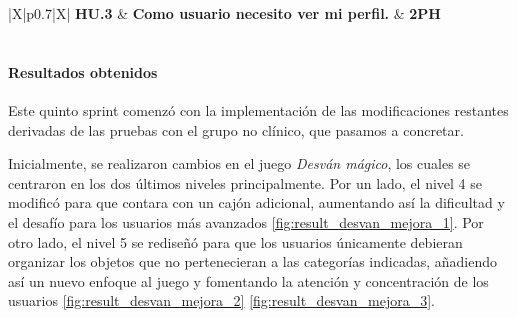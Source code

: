 \begin{table}[H]
\renewcommand{\arraystretch}{1.3}
\setlength{\tabcolsep}{10pt}
\vspace{0.8em}
\centering
\begin{tabularx}{\textwidth}{|X|p{}|X|}
    \hline
    \textbf{HU.3} & \textbf{Como usuario necesito ver mi perfil.} & \textbf{2PH} \\
    \hline
     \\
    \hline
\end{tabularx}
\caption{HU.3 - Como usuario necesito ver mi perfil - Desglose de tareas}
\vspace{0.8em}
\end{table}

\paragraph{Resultados obtenidos}
Este quinto sprint comenzó con la implementación de las modificaciones restantes derivadas de las pruebas con el grupo no clínico, que pasamos a concretar.

Inicialmente, se realizaron cambios en el juego \textit{Desván mágico}, los cuales se centraron en los dos últimos niveles principalmente.
Por un lado, el nivel 4 se modificó para que contara con un cajón adicional, aumentando así la dificultad y el desafío para los usuarios más avanzados \cref{fig:result_desvan_mejora_1}.
Por otro lado, el nivel 5 se rediseñó para que los usuarios únicamente debieran organizar los objetos que no pertenecieran a las categorías indicadas, añadiendo así un nuevo enfoque al juego y fomentando la atención y concentración de los usuarios \cref{fig:result_desvan_mejora_2} \cref{fig:result_desvan_mejora_3}.

